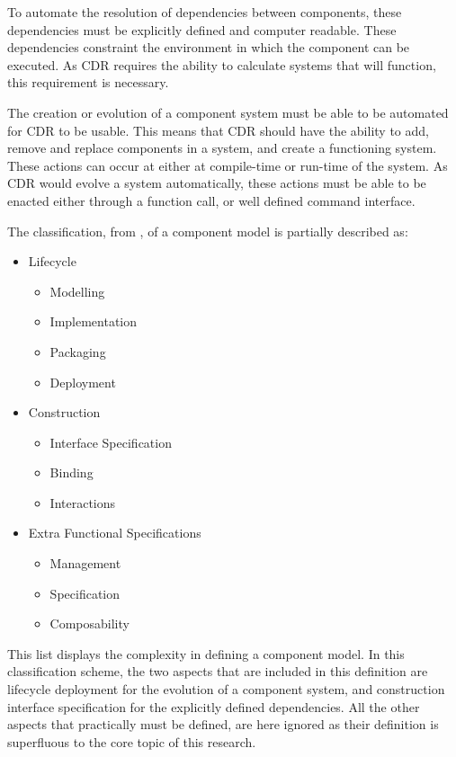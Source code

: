 To automate the resolution of dependencies between components, these dependencies must be explicitly defined and computer readable.
These dependencies constraint the environment in which the component can be executed.
As CDR requires the ability to calculate systems that will function, this requirement is necessary.

The creation or evolution of a component system must be able to be automated for CDR to be usable.
This means that CDR should have the ability to add, remove and replace components in a system, and create a functioning system.
These actions can occur at either at compile-time or run-time of the system.
As CDR would evolve a system automatically, these actions must be able to be enacted either through a function call, or well defined command interface.

The classification, from \cite{Crnkovic2011}, of a component model is partially described as:
\begin{itemize}
  \item Lifecycle 
  		\begin{itemize}
	  		\item Modelling
	  		\item Implementation
	  		\item Packaging
	  		\item Deployment
		\end{itemize}
	\item Construction
		\begin{itemize}
	  		\item Interface Specification
	  		\item Binding
	  		\item Interactions 
		\end{itemize}
	\item Extra Functional Specifications
		\begin{itemize}
	  		\item Management
	  		\item Specification
	  		\item Composability
		\end{itemize}	
\end{itemize}  
This list displays the complexity in defining a component model.
In this classification scheme, the two aspects that are included in this definition are lifecycle deployment for the evolution of a component system, 
and construction interface specification for the explicitly defined dependencies.
All the other aspects that practically must be defined, are here ignored as their definition is superfluous to the core topic of this research.

